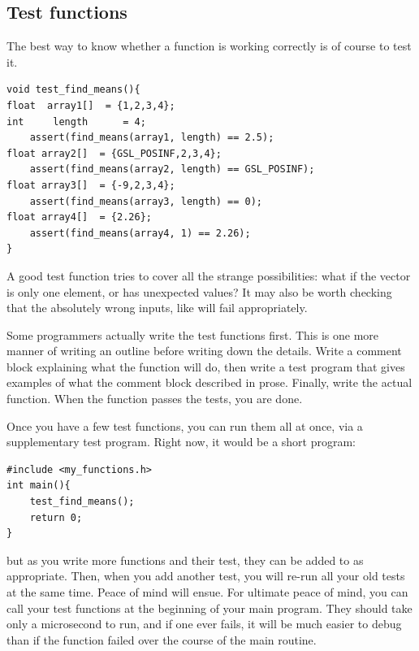 
\subsection{Test functions} The best way to know whether a
function is working correctly is of course to test it.
\begin{lstlisting}
void test_find_means(){
float  array1[]  = {1,2,3,4};
int     length      = 4;
    assert(find_means(array1, length) == 2.5);
float array2[]  = {GSL_POSINF,2,3,4};
    assert(find_means(array2, length) == GSL_POSINF);
float array3[]  = {-9,2,3,4};
    assert(find_means(array3, length) == 0);
float array4[]  = {2.26};
    assert(find_means(array4, 1) == 2.26);
}
\end{lstlisting}

A good test function tries to cover all the strange possibilities: what
if the vector is only one element, or has unexpected values? It may also
be worth checking that the absolutely wrong inputs, like
 will fail appropriately.

Some programmers actually write the test functions first.  This is one
more manner of 
writing an outline before writing down the details. Write a comment
block explaining what the function will do, then write a test program that
gives examples of what the comment block described in prose. Finally,
write the actual function. When the function passes the tests, you
are done.

Once you have a few test functions, you can run them all at once, via a
supplementary test program. Right now, it would be a short program:
\begin{lstlisting}
#include <my_functions.h>
int main(){
    test_find_means();
    return 0;
}
\end{lstlisting}
but as you write more functions and their test, they can be added to
 as appropriate. Then, when you add another test, you will
re-run all your old tests at the same time. Peace of mind will ensue.
For ultimate peace of mind, you can call your test functions at the
beginning of your main program. They should take only a microsecond to
run, and if one ever fails, it will be much easier to debug than if the
function failed over the course of the main routine.

